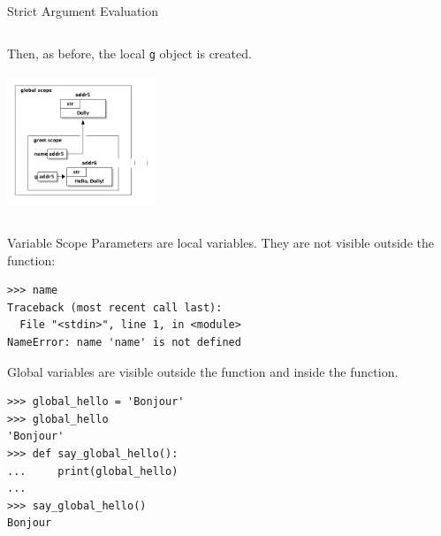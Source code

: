 \documentclass[smaller, aspectratio=1610]{beamer}
\begin{document}
\begin{frame}[label={sec:org5be5366},fragile]{Strict Argument Evaluation}
\begin{columns}
\begin{column}{0.3\columnwidth}
\begin{block}{}
Then, as before, the local \texttt{g} object is created.

\begin{center}
\includegraphics[width=1.75in]{diagrams/greet-again-scope.png}
\end{center}
\end{block}
\end{column}
\end{columns}
\end{frame}



\begin{frame}[label={sec:org6292025},fragile]{Variable Scope}
 Parameters are local variables. They are not visible outside the function:

\lstset{language=Python,label= ,caption= ,captionpos=b,numbers=none}
\begin{lstlisting}
>>> name
Traceback (most recent call last):
  File "<stdin>", line 1, in <module>
NameError: name 'name' is not defined
\end{lstlisting}

Global variables are visible outside the function and inside the function.

\lstset{language=Python,label= ,caption= ,captionpos=b,numbers=none}
\begin{lstlisting}
>>> global_hello = 'Bonjour'
>>> global_hello
'Bonjour'
>>> def say_global_hello():
...     print(global_hello)
...
>>> say_global_hello()
Bonjour
\end{lstlisting}
\end{frame}
\end{document}
